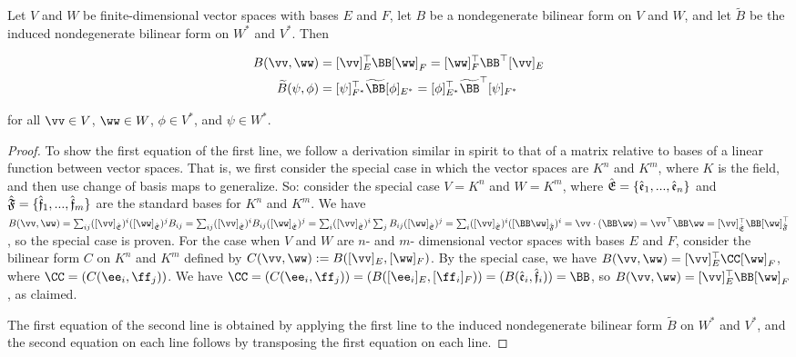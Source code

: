 \begin{lemma}
     Let $V$ and $W$ be finite-dimensional vector spaces with bases $E$ and $F$, let $B$ be a nondegenerate bilinear form on $V$ and $W$, and let $\widetilde{B}$ be the induced nondegenerate bilinear form on $W^*$ and $V^*$. Then 

    \begin{align*}
        B(\vv, \ww) &= [\vv]_E^\top \BB [\ww]_F = [\ww]_F^\top \BB^\top [\vv]_E
        \\
        \widetilde{B}(\psi, \phi) &= [\psi]_{F^*}^\top \widetilde{\BB} [\phi]_{E^*} = [\phi]_{E^*}^\top \widetilde{\BB}^\top [\psi]_{F^*}
    \end{align*}
    
    for all $\vv \in V$, $\ww \in W$, $\phi \in V^*$, and $\psi \in W^*$.
\end{lemma}

\begin{proof}
    
    To show the first equation of the first line, we follow a derivation similar in spirit to that of a matrix relative to bases of a linear function between vector spaces. That is, we first consider the special case in which the vector spaces are $K^n$ and $K^m$, where $K$ is the field, and then use change of basis maps to generalize. So: consider the special case $V = K^n$ and $W = K^m$, where ${\hat{\mathfrak{E}}} = \{\hat{\mathfrak{e}}_1, ..., \hat{\mathfrak{e}}_n\}$ and ${\hat{\mathfrak{F}}} = \{\hat{\mathfrak{f}}_1, ..., \hat{\mathfrak{f}}_m\}$ are the standard bases for $K^n$ and $K^m$. We have $B(\vv, \ww) = \sum_{ij} ([\vv]_\sE)^i ([\ww]_\sE)^j B_{ij} = \sum_{ij} ([\vv]_\sE)^i B_{ij} ([\ww]_\sE)^j = \sum_i ([\vv]_\sE)^i \sum_j B_{ij} ([\ww]_\sE)^j = \sum_i ([\vv]_\sE)^i ([\BB \ww]_\sF)^i = \vv \cdot (\BB \ww) = \vv^\top \BB \ww = [\vv]_\sE^\top \BB [\ww]_\sF^\top$, so the special case is proven. For the case when $V$ and $W$ are $n$- and $m$- dimensional vector spaces with bases $E$ and $F$, consider the bilinear form $C$ on $K^n$ and $K^m$ defined by $C(\vv, \ww) := B([\vv]_E, [\ww]_F)$. By the special case, we have $B(\vv, \ww) = [\vv]_E^\top \CC [\ww]_F$, where $\CC = (C(\ee_i, \ff_j))$. We have $\CC = (C(\ee_i, \ff_j)) = (B([\ee_i]_E, [\ff_i]_F)) = (B(\see_i, \sff_i)) = \BB$, so $B(\vv, \ww) = [\vv]_E^\top \BB [\ww]_F$, as claimed.
    
    The first equation of the second line is obtained by applying the first line to the induced nondegenerate bilinear form $\widetilde{B}$ on $W^*$ and $V^*$, and the second equation on each line follows by transposing the first equation on each line.
\end{proof}
 
